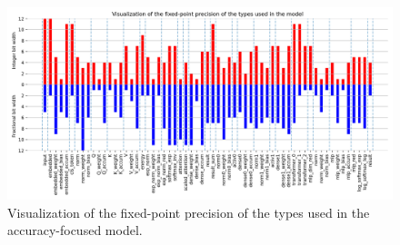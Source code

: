 \begin{figure}[hpt!]
  \centering
  \includegraphics[trim={0cm 0cm 1cm 7.8mm}, clip, width=1.0\textwidth, center]{../logs/bit_width_visualization.png}
  \caption{Visualization of the fixed-point precision of the types used in the accuracy-focused model.}
  \label{fig:post-training-bit-widths}
\end{figure}
